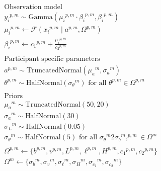 \documentclass[a4paper,12pt]{article}
\begin{document}
\begin{align*}
    &\text{Observation model} \\
    &{y_i}^{p,m}\sim \text{Gamma}\left({\mu_i}^{p,m}\cdot{\beta_i}^{p,m}, {\beta_i}^{p,m}\right) \\
    &{\mu_i}^{p,m} \gets \mathcal{F}\left({x_i}^{p,m} \mid a^{p,m}, {\Omega}^{p,m}\right) \\
    &{\beta_i}^{p,m} \gets {c_1}^{p,m} + \frac{{\mu_i}^{p,m}}{{c_2}^{p,m}}\\\\
    &\text{Participant specific parameters} \\
    &a^{p,m} \sim \text{TruncatedNormal}\left({\mu_a}^{m}, {\sigma_a}^{m}\right)\\
    &{\theta}^{p,m} \sim \text{HalfNormal}\left({\sigma_{\theta}}^{m}\right) \text{ for all } \theta^{p,m} \in {\Omega}^{p,m}\\\\
    &\text{Priors} \\
    & {\mu_a}^m \sim \text{TruncatedNormal}\left(50, 20\right)\\
    &{\sigma_a}^m \sim \text{HalfNormal}\left(30\right)\\
    &{\sigma_L}^{m} \sim \text{HalfNormal}\left(0.05\right)\\
    &{\sigma_\theta}^m \sim \text{HalfNormal}\left(5\right) \text{ for all } {\sigma_\theta}^m2{\sigma_{b}}^m,  ^{p,m} \in \Omega^m\\\\
    &{\Omega}^{p,m} \gets \{{b}^{p,m}, {v}^{p,m}, {L}^{p,m}, {\ell}^{p,m}, {H}^{p,m}, {c_1}^{p,m}, {c_2}^{p,m}\}\\
    &\Omega^m \gets \{{\sigma_{b}}^m, {\sigma_{v}}^m,  {\sigma_{\ell}}^m, {\sigma_{H}}^m, {\sigma_{c_1}}^m, {\sigma_{c_2}}^m\}
\end{align*}
\end{document}
